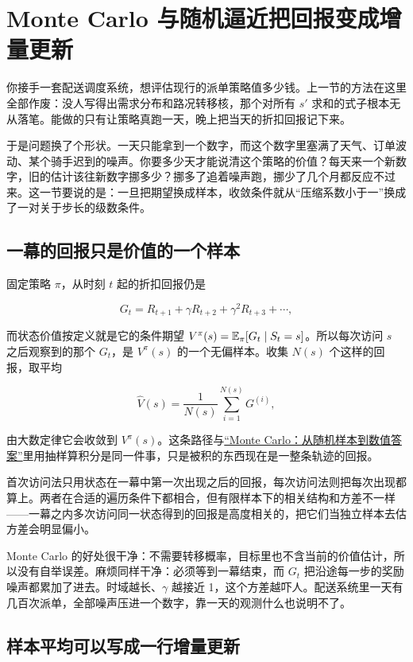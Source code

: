 \section{Monte Carlo 与随机逼近把回报变成增量更新}
\label{sec:16-Control-and-Reinforcement-Learning/02-Reinforcement-Learning/03}

你接手一套配送调度系统，想评估现行的派单策略值多少钱。上一节的方法在这里全部作废：没人写得出需求分布和路况转移核，那个对所有 \(s'\) 求和的式子根本无从落笔。能做的只有让策略真跑一天，晚上把当天的折扣回报记下来。

于是问题换了个形状。一天只能拿到一个数字，而这个数字里塞满了天气、订单波动、某个骑手迟到的噪声。你要多少天才能说清这个策略的价值？每天来一个新数字，旧的估计该往新数字挪多少？挪多了追着噪声跑，挪少了几个月都反应不过来。这一节要说的是：一旦把期望换成样本，收敛条件就从``压缩系数小于一''换成了一对关于步长的级数条件。

\subsection{一幕的回报只是价值的一个样本}

固定策略 \(\pi\)，从时刻 \(t\) 起的折扣回报仍是

\[
G_t=R_{t+1}+\gamma R_{t+2}+\gamma^2R_{t+3}+\cdots,
\]

而状态价值按定义就是它的条件期望 \(V^\pi(s)=\mathbb{E}_\pi[G_t\mid S_t=s]\)。所以每次访问 \(s\) 之后观察到的那个 \(G_t\)，是 \(V^\pi(s)\) 的一个无偏样本。收集 \(N(s)\) 个这样的回报，取平均

\[
\widehat V(s)=\frac1{N(s)}\sum_{i=1}^{N(s)}G^{(i)},
\]

由大数定律它会收敛到 \(V^\pi(s)\)。这条路径与\hyperref[sec:05-Probability/08-Limit-Theorems/05]{``Monte Carlo：从随机样本到数值答案''}里用抽样算积分是同一件事，只是被积的东西现在是一整条轨迹的回报。

首次访问法只用状态在一幕中第一次出现之后的回报，每次访问法则把每次出现都算上。两者在合适的遍历条件下都相合，但有限样本下的相关结构和方差不一样——一幕之内多次访问同一状态得到的回报是高度相关的，把它们当独立样本去估方差会明显偏小。

Monte Carlo 的好处很干净：不需要转移概率，目标里也不含当前的价值估计，所以没有自举误差。麻烦同样干净：必须等到一幕结束，而 \(G_t\) 把沿途每一步的奖励噪声都累加了进去。时域越长、\(\gamma\) 越接近 1，这个方差越吓人。配送系统里一天有几百次派单，全部噪声压进一个数字，靠一天的观测什么也说明不了。

\subsection{样本平均可以写成一行增量更新}


